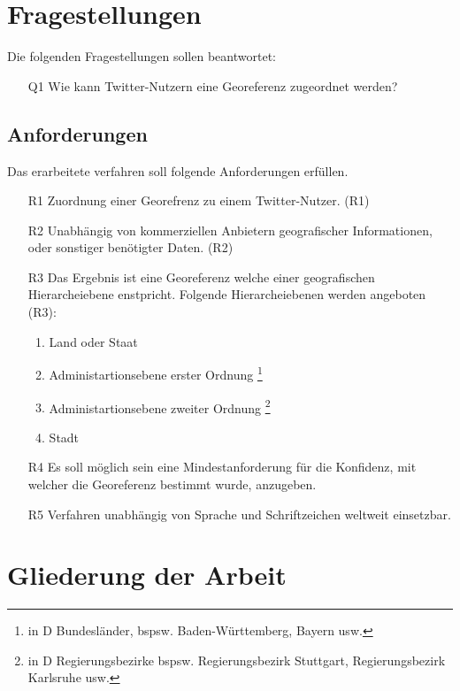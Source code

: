 	\section{Fragestellungen}\label{sec:fragestellung}
		
		Die folgenden Fragestellungen sollen beantwortet: 
		\begin{enumerate}
			\item[Q1] Wie kann Twitter-Nutzern eine Georeferenz zugeordnet werden?
		\end{enumerate}
		  	
	\subsection{Anforderungen}\label{sec:Anforderungen}
		
		
		Das erarbeitete verfahren soll folgende Anforderungen erfüllen.
			\begin{enumerate}
				\item[R1] Zuordnung einer Georefrenz zu einem Twitter-Nutzer. (R1) 
				\item[R2] Unabhängig von kommerziellen Anbietern geografischer Informationen, oder sonstiger benötigter Daten. (R2)
				\item[R3] Das Ergebnis ist eine Georeferenz welche einer geografischen Hierarcheiebene enstpricht. Folgende Hierarcheiebenen werden angeboten (R3): 
				\begin{enumerate}
				 	\item Land oder Staat
				 	\item Administartionsebene erster Ordnung \footnote{in D Bundesländer, bspsw. Baden-Württemberg, Bayern usw. }
				 	\item Administartionsebene zweiter Ordnung \footnote{in D Regierungsbezirke bspsw. Regierungsbezirk Stuttgart, Regierungsbezirk Karlsruhe usw.}
				 	\item Stadt
				 \end{enumerate} 
				\item[R4] Es soll möglich sein eine Mindestanforderung für die Konfidenz, mit welcher die Georeferenz bestimmt wurde, anzugeben.  
				\item[R5] Verfahren unabhängig von Sprache und Schriftzeichen weltweit einsetzbar.
			\end{enumerate}
		
	\section{Gliederung der Arbeit}

